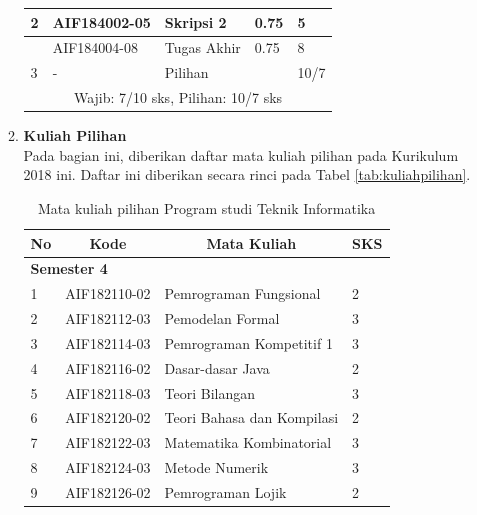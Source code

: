 \documentclass[a4paper,twoside]{article}
\begin{document}
\begin{enumerate}
\begin{enumerate}
\begin{table}[H]
\begin{tabular}{|p{0.5cm}|p{2.85cm}|p{4.95cm}|p{2.7cm}|p{2.7cm}|}
					2 &	AIF184002-05 &	Skripsi 2 &	0.75 &	5  \\ \hline
					 & AIF184004-08 &	Tugas Akhir &	0.75 &	8  \\ \hline
					3 &	- &	Pilihan	&  &	10/7  \\ \hline
					\multicolumn{5}{|c|}{Wajib: 7/10 sks, Pilihan: 10/7 sks} \\ \hline
				\end{tabular}
			\label{tab:2_strukturkurikulum2018}
		\end{table}
		
		\item \textbf{Kuliah Pilihan} \\
		Pada bagian ini, diberikan daftar mata kuliah pilihan pada Kurikulum 2018 ini. Daftar ini diberikan secara rinci pada Tabel \ref{tab:kuliahpilihan}.

\begin{table}[H]
	\centering
		\caption{Mata kuliah pilihan Program studi Teknik Informatika}
		\begin{tabular}{|p{0.5cm}|p{2.85cm}|p{4.95cm}|p{2.7cm}|}
			\hline
			\multicolumn{1}{|c|}{\textbf{No}} & \multicolumn{1}{c|}{\textbf{Kode}} & \multicolumn{1}{c|}{\textbf{Mata Kuliah}} & \multicolumn{1}{c|}{\textbf{SKS}} \\ \hline
\multicolumn{4}{|l|}{\textbf{Semester 4}}                                \\ \hline
1   & AIF182110-02    & Pemrograman Fungsional                     & 2   \\ \hline
2   & AIF182112-03    & Pemodelan Formal                           & 3   \\ \hline
3   & AIF182114-03    & Pemrograman Kompetitif 1                   & 3   \\ \hline
4   & AIF182116-02    & Dasar-dasar Java                           & 2   \\ \hline
5   & AIF182118-03    & Teori Bilangan                             & 3   \\ \hline
6   & AIF182120-02    & Teori Bahasa dan Kompilasi                 & 2   \\ \hline
7   & AIF182122-03    & Matematika Kombinatorial                   & 3   \\ \hline
8   & AIF182124-03    & Metode Numerik                             & 3   \\ \hline
9   & AIF182126-02    & Pemrograman Lojik                          & 2   \\ \hline


\end{tabular}
\end{table}
\end{enumerate}
\end{enumerate}
\end{document}
